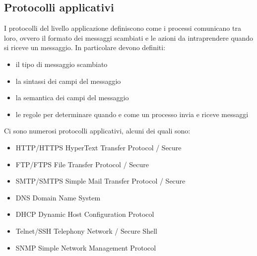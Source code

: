 \documentclass[12pt]{article}
\begin{document}
\subsection{Protocolli applicativi}
I protocolli del livello applicazione definiscono come i processi comunicano tra loro, ovvero il formato dei messaggi scambiati e le azioni da intraprendere quando si riceve un messaggio. 
In particolare devono definiti:
\begin{itemize}
    \item il tipo di messaggio scambiato
    \item la sintassi dei campi del messaggio
    \item la semantica dei campi del messaggio
    \item le regole per determinare quando e come un processo invia e riceve messaggi
\end{itemize}
Ci sono numerosi protocolli applicativi, alcuni dei quali sono:
\begin{itemize}
    \item HTTP/HTTPS HyperText Transfer Protocol / Secure
    \item FTP/FTPS File Transfer Protocol / Secure
    \item SMTP/SMTPS Simple Mail Transfer Protocol / Secure
    \item DNS Domain Name System
    \item DHCP Dynamic Host Configuration Protocol
    \item Telnet/SSH Telephony Network / Secure Shell
    \item SNMP Simple Network Management Protocol
\end{itemize}
\end{document}
